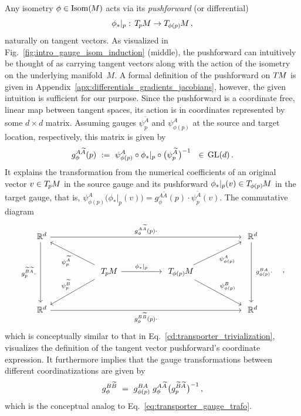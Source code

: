Any isometry $\phi \in \operatorname{Isom}(\mkern-1.5mu M \mkern-.5mu)$ acts via its \emph{pushforward} (or differential)
\begin{align}
    \phi_{*}|_p:\, \TpM \to \TphipM \,,
\end{align}
naturally on tangent vectors.
As visualized in Fig.~\ref{fig:intro_gauge_isom_induction} (middle), the pushforward can intuitively be thought of as carrying tangent vectors along with the action of the isometry on the underlying manifold~$M$.
A formal definition of the pushforward on $T\mkern-1.5muM$ is given in Appendix~\ref{apx:differentials_gradients_jacobians}, however, the given intuition is sufficient for our purpose.
Since the pushforward is a coordinate free, linear map between tangent spaces, its action is in coordinates represented by some $d\times d$ matrix.
Assuming gauges $\psi_p^{\widetilde{A}}$ and $\psi_{\phi(p)}^A$ at the source and target location, respectively, this matrix is given by
\begin{align}\label{eq:isom_induced_gauge_trafo_24}
    g_\phi^{A\widetilde{A}}(p)\ :=\ \psi_{\phi(p)}^A \circ \phi_*|_p \circ \big( \psi_p^{\widetilde{A}} \mkern1mu\big)^{-1} \ \ \in\, \operatorname{GL}(d) \,.
\end{align}
It explains the transformation from the numerical coefficients of an original vector $v\in T_{\mkern-1.5mu p}\mkern-.5muM$ in the source gauge and its pushforward $\phi_*|_p(v) \in T_{\mkern-1.5mu \phi(p)}\mkern-1muM$ in the target gauge, that is,
$\psi_{\phi(p)}^A \big( \phi_*|_p (v) \big) = g_\phi^{A\widetilde{A}}(p) \cdot \psi_p^{\widetilde{A}}(v)$.
The commutative diagram
\begin{equation}
\begin{tikzcd}[column sep=54pt, row sep=28pt, font=\normalsize]
    \R^d
        \arrow[dd, "g_p^{\widetilde{B}\widetilde{A}}\cdot\ "']
        \arrow[rrr, "g_\phi^{A\widetilde{A}}(p)\cdot"]
    & &[-1ex] &
    \R^d
        \arrow[dd, "\ g_{\phi(p)}^{BA}\cdot"]
    \\
    &
    \TpM
        \arrow[ul, "\psi_p^{\widetilde{A}}"]
        \arrow[dl, "\psi_p^{\widetilde{B}}"']
        \arrow[r, "\phi_*|_p"]
    &
    \TphipM
        \arrow[ur, "\psi_{\phi(p)}^A"']
        \arrow[dr, "\psi_{\phi(p)}^B"]
    \\
    \R^d
        \arrow[rrr, "g_\phi^{B\widetilde{B}}(p)\cdot"']
    & & &
    \R^d
\end{tikzcd}
\quad,
\end{equation}
which is conceptually similar to that in Eq.~\eqref{cd:transporter_trivialization}, visualizes the definition of the tangent vector pushforward's coordinate expression.
It furthermore implies that the gauge transformations between different coordinatizations are given by
\begin{align}
    g_\phi^{B\widetilde{B}}
    \ =\ g_{\phi(p)}^{BA} \; g_\phi^{A\widetilde{A}} \mkern1mu \big(g_p^{\widetilde{B}\widetilde{A}} \mkern1mu\big)^{-1} \,,
\end{align}
which is the conceptual analog to Eq.~\eqref{eq:transporter_gauge_trafo}.










